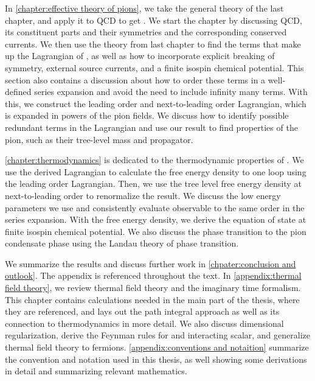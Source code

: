 In \autoref{chapter:effective theory of pions}, we take the general theory of the last chapter, and apply it to QCD to get \chpt.
We start the chapter by discussing QCD, its constituent parts and their symmetries and the corresponding conserved currents.
We then use the theory from last chapter to find the terms that make up the Lagrangian of \chpt, as well as how to incorporate explicit breaking of symmetry, external source currents, and a finite isospin chemical potential.
This section also contains a discussion about how to order these terms in a well-defined series expansion and avoid the need to include infinity many terms.
With this, we construct the leading order and next-to-leading order Lagrangian, which is expanded in powers of the pion fields.
We discuss how to identify possible redundant terms in the Lagrangian and use our result to find properties of the pion, such as their tree-level mass and propagator.

\cref{chapter:thermodynamics} is dedicated to the thermodynamic properties of \chpt.
We use the derived Lagrangian to calculate the free energy density to one loop using the leading order Lagrangian. 
Then, we use the tree level free energy density at next-to-leading order to renormalize the result.
We discuss the low energy parameters we use and consistently evaluate observable to the same order in the series expansion.
With the free energy density, we derive the equation of state at finite isospin chemical potential.
We also discuss the phase transition to the pion condensate phase using the Landau theory of phase transition.

We summarize the results and discuss further work in \autoref{chpater:conclusion and outlook}.
The appendix is referenced throughout the text.
In \autoref{appendix:thermal field theory}, we review thermal field theory and the imaginary time formalism.
This chapter contains calculations needed in the main part of the thesis, where they are referenced, and lays out the path integral approach as well as its connection to thermodynamics in more detail.
We also discuss dimensional regularization, derive the Feynman rules for and interacting scalar, and generalize thermal field theory to fermions.
\autoref{appendix:conventions and notaition} summarize the convention and notation used in this thesis, as well showing some derivations in detail and summarizing relevant mathematics.


